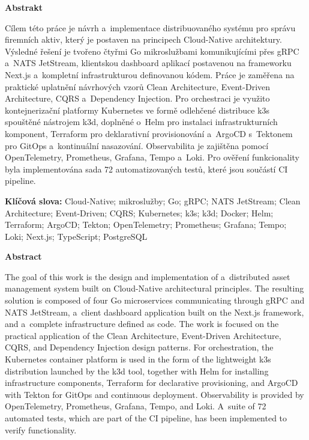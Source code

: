 \documentclass[11pt, a4paper, oneside]{article}
\begin{document}
\clearpage


\thispagestyle{empty}
\noindent\textbf{Abstrakt}

\noindent Cílem této práce je návrh a~implementace distribuovaného systému pro správu firemních aktiv, který je postaven na principech Cloud-Native architektury.
Výsledné řešení je tvořeno čtyřmi Go mikroslužbami komunikujícími přes gRPC a~NATS JetStream, klientskou dashboard aplikací postavenou na frameworku Next.js a~kompletní infrastrukturou definovanou kódem.
Práce je zaměřena na praktické uplatnění návrhových vzorů Clean Architecture, Event-Driven Architecture, CQRS a~Dependency Injection.
Pro orchestraci je využito kontejnerizační platformy Kubernetes ve formě odlehčené distribuce k3s spouštěné nástrojem k3d, doplněné o~Helm pro instalaci infrastrukturních komponent, Terraform pro deklarativní provisionování a~ArgoCD s~Tektonem pro GitOps a~kontinuální nasazování.
Observabilita je zajištěna pomocí OpenTelemetry, Prometheus, Grafana, Tempo a~Loki.
Pro ověření funkcionality byla implementována sada 72 automatizovaných testů, které jsou součástí CI pipeline.

\vspace{1em}
\noindent\textbf{Klíčová slova:} Cloud-Native; mikroslužby; Go; gRPC; NATS JetStream; Clean Architecture; Event-Driven; CQRS; Kubernetes; k3s; k3d; Docker; Helm; Terraform; ArgoCD; Tekton; OpenTelemetry; Prometheus; Grafana; Tempo; Loki; Next.js; TypeScript; PostgreSQL
\vspace{4em}


\noindent\textbf{Abstract}

\noindent The goal of this work is the design and implementation of a~distributed asset management system built on Cloud-Native architectural principles.
The resulting solution is composed of four Go microservices communicating through gRPC and NATS JetStream, a~client dashboard application built on the Next.js framework, and a~complete infrastructure defined as code.
The work is focused on the practical application of the Clean Architecture, Event-Driven Architecture, CQRS, and Dependency Injection design patterns.
For orchestration, the Kubernetes container platform is used in the form of the lightweight k3s distribution launched by the k3d tool, together with Helm for installing infrastructure components, Terraform for declarative provisioning, and ArgoCD with Tekton for GitOps and continuous deployment.
Observability is provided by OpenTelemetry, Prometheus, Grafana, Tempo, and Loki.
A~suite of 72 automated tests, which are part of the CI pipeline, has been implemented to verify functionality.
\end{document}
